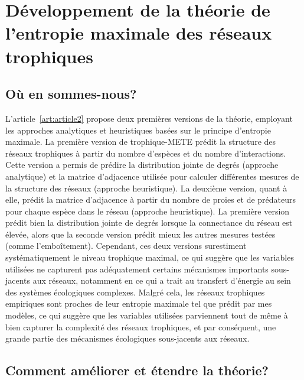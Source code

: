 \section{Développement de la théorie de l'entropie maximale des réseaux trophiques} 

\subsection{Où en sommes-nous?} 

L'article~\ref{art:article2} propose deux premières versions de la théorie,
employant les approches analytiques et heuristiques basées sur le principe
d'entropie maximale. La première version de trophique-METE prédit la structure
des réseaux trophiques à partir du nombre d'espèces et du nombre d'interactions.
Cette version a permis de prédire la distribution jointe de degrés (approche
analytique) et la matrice d'adjacence utilisée pour calculer différentes mesures
de la structure des réseaux (approche heuristique). La deuxième version, quant à
elle, prédit la matrice d'adjacence à partir du nombre de proies et de
prédateurs pour chaque espèce dans le réseau (approche heuristique). La première
version prédit bien la distribution jointe de degrés lorsque la connectance du
réseau est élevée, alors que la seconde version prédit mieux les autres mesures
testées (comme l'emboîtement). Cependant, ces deux versions surestiment
systématiquement le niveau trophique maximal, ce qui suggère que les variables
utilisées ne capturent pas adéquatement certains mécanismes importants
sous-jacents aux réseaux, notamment en ce qui a trait au transfert d'énergie au
sein des systèmes écologiques complexes. Malgré cela, les réseaux trophiques
empiriques sont proches de leur entropie maximale tel que prédit par mes
modèles, ce qui suggère que les variables utilisées parviennent tout de même à
bien capturer la complexité des réseaux trophiques, et par conséquent, une
grande partie des mécanismes écologiques sous-jacents aux réseaux. 

\subsection{Comment améliorer et étendre la théorie?} 

